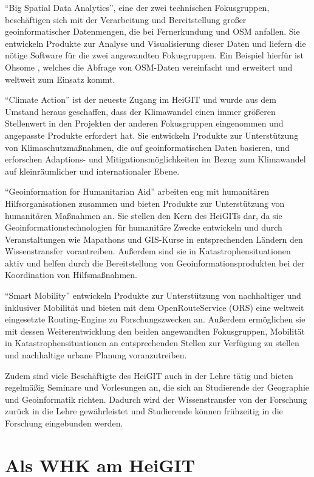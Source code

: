\documentclass[11pt]{article}
\begin{document}
\enquote{Big Spatial Data Analytics}, eine der zwei technischen Fokusgruppen, beschäftigen sich mit der Verarbeitung und Bereitstellung großer geoinformatischer Datenmengen, die bei Fernerkundung und OSM anfallen. Sie entwickeln Produkte zur Analyse und Visualisierung dieser Daten und liefern die nötige Software für die zwei angewandten Fokusgruppen. Ein Beispiel hierfür ist Ohsome \autocite{HeiGIT2024a}, welches die Abfrage von OSM-Daten vereinfacht und erweitert und weltweit zum Einsatz kommt.

\enquote{Climate Action} ist der neueste Zugang im HeiGIT und wurde aus dem Umstand heraus geschaffen, dass der Klimawandel einen immer größeren Stellenwert in den Projekten der anderen Fokusgruppen eingenommen und angepasste Produkte erfordert hat. Sie entwickeln Produkte zur Unterstützung von Klimaschutzmaßnahmen, die auf geoinformatischen Daten basieren, und erforschen Adaptions- und Mitigationsmöglichkeiten im Bezug zum Klimawandel auf kleinräumlicher und internationaler Ebene.

\enquote{Geoinformation for Humanitarian Aid} arbeiten eng mit humanitären Hilfsorganisationen zusammen und bieten Produkte zur Unterstützung von humanitären Maßnahmen an. Sie stellen den Kern des HeiGITs dar, da sie Geoinformationstechnologien für humanitäre Zwecke entwickeln und durch Veranstaltungen wie Mapathons und GIS-Kurse in entsprechenden Ländern den Wissenstransfer vorantreiben. Außerdem sind sie in Katastrophensituationen aktiv und helfen durch die Bereitstellung von Geoinformationsprodukten bei der Koordination von Hilfsmaßnahmen.

\enquote{Smart Mobility} entwickeln Produkte zur Unterstützung von nachhaltiger und inklusiver Mobilität und bieten mit dem OpenRouteService (ORS) \autocite{HeiGIT2024b} eine weltweit eingesetzte Routing-Engine zu Forschungszwecken an. Außerdem ermöglichen sie mit dessen Weiterentwicklung den beiden angewandten Fokusgruppen, Mobilität in Katastrophensituationen an entsprechenden Stellen zur Verfügung zu stellen und nachhaltige urbane Planung voranzutreiben.

Zudem sind viele Beschäftigte des HeiGIT auch in der Lehre tätig und bieten regelmäßig Seminare und Vorlesungen an, die sich an Studierende der Geographie und Geoinformatik richten. Dadurch wird der Wissenstransfer von der Forschung zurück in die Lehre gewährleistet und Studierende können frühzeitig in die Forschung eingebunden werden.

\section{Als WHK am HeiGIT}
\end{document}
